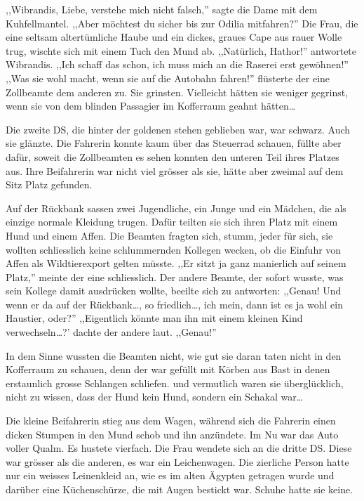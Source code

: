 \documentclass[11pt,titlepage,a5paper]{book}
\begin{document}
 ,,Wibrandis, Liebe, verstehe mich nicht falsch,'' sagte die Dame mit dem Kuhfellmantel. ,,Aber möchtest du sicher bis zur Odilia mitfahren?'' Die Frau, die eine seltsam altertümliche Haube und ein dickes, graues Cape aus rauer Wolle trug, wischte sich mit einem Tuch den Mund ab. ,,Natürlich, Hathor!'' antwortete Wibrandis. ,,Ich schaff das schon, ich muss mich an die Raserei erst gewöhnen!'' ,,Was sie wohl macht, wenn sie auf die Autobahn fahren!'' flüsterte der eine Zollbeamte dem anderen zu. Sie grinsten. Vielleicht hätten sie weniger gegrinst, wenn sie von dem blinden Passagier im Kofferraum geahnt hätten\dots
 
Die zweite DS, die hinter der goldenen stehen geblieben war, war schwarz. Auch sie glänzte. Die Fahrerin konnte kaum über das Steuerrad schauen, füllte aber dafür, soweit die Zollbeamten es sehen konnten den unteren Teil ihres Platzes aus. Ihre Beifahrerin war nicht viel grösser als sie, hätte aber zweimal auf dem Sitz Platz gefunden.

Auf der Rückbank sassen zwei Jugendliche, ein Junge und ein Mädchen, die als einzige normale Kleidung trugen. Dafür teilten sie sich ihren Platz mit einem Hund und einem Affen. Die Beamten fragten sich, stumm, jeder für sich, sie wollten schliesslich keine schlummernden Kollegen wecken, ob die Einfuhr von Affen als Wildtierexport gelten müsste. ,,Er sitzt ja ganz manierlich auf seinem Platz,'' meinte der eine schliesslich. Der andere Beamte, der sofort wusste, was sein Kollege damit ausdrücken wollte, beeilte sich zu antworten: ,,Genau! Und wenn er da auf der Rückbank\dots , so friedlich\dots , ich mein, dann ist es ja wohl ein Haustier, oder?'' ,,Eigentlich könnte man ihn mit einem kleinen Kind verwechseln\dots ?' dachte der andere laut. ,,Genau!''
 
 In dem Sinne wussten die Beamten nicht, wie gut sie daran taten nicht in den Kofferraum zu schauen, denn der war gefüllt mit Körben aus Bast in denen erstaunlich grosse Schlangen schliefen. und vermutlich waren sie überglücklich, nicht zu wissen, dass der Hund kein Hund, sondern ein Schakal war\dots
 
Die kleine Beifahrerin stieg aus dem Wagen, während sich die Fahrerin einen dicken Stumpen in den Mund schob und ihn anzündete. Im Nu war das Auto voller Qualm. Es hustete vierfach. Die Frau wendete sich an die dritte DS. Diese war grösser als die anderen, es war ein Leichenwagen. Die zierliche Person hatte nur ein weisses Leinenkleid an, wie es im alten Ägypten getragen wurde und darüber eine Küchenschürze, die mit Augen bestickt war. Schuhe hatte sie keine.
\end{document}

